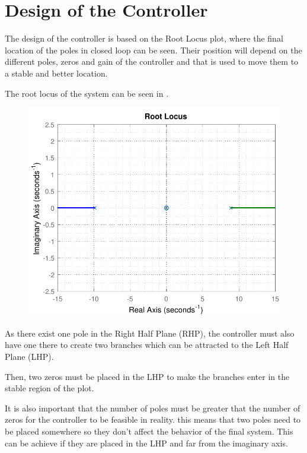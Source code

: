 \section{Design of the Controller}\label{designController}
The design of the controller is based on the Root Locus plot, where the final location of the poles in closed loop can be seen. Their position will depend on the different poles, zeros and gain of the controller and that is used to move them to a stable and better location.

The root locus of the system can be seen in .

\begin{figure}[H]
	\centering 
	\includegraphics[scale=.56]{figures/rlocusCubli}
 	\label{rlocusCubli2}
\end{figure}
%
As there exist one pole in the Right Half Plane (RHP), the controller must also have one there to create two branches which can be attracted to the Left Half Plane (LHP).

Then, two zeros must be placed in the LHP to make the branches enter in the stable region of the plot.

It is also important that the number of poles must be greater that the number of zeros for the controller to be feasible in reality. this means that two poles need to be placed somewhere so they don't affect the behavior of the final system. This can be achieve if they are placed in the LHP and far from the imaginary axis.

